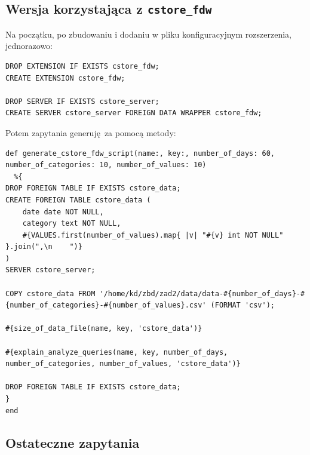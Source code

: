 \documentclass[a4paper,11pt]{article}
\begin{document}
\subsection{Wersja korzystająca z \texttt{cstore\_fdw}}

Na początku, po zbudowaniu i dodaniu w pliku konfiguracyjnym rozszerzenia, jednorazowo:
\begin{lstlisting}
DROP EXTENSION IF EXISTS cstore_fdw;
CREATE EXTENSION cstore_fdw;

DROP SERVER IF EXISTS cstore_server;
CREATE SERVER cstore_server FOREIGN DATA WRAPPER cstore_fdw;
\end{lstlisting}
Potem zapytania generuję za pomocą metody:
\begin{lstlisting}
def generate_cstore_fdw_script(name:, key:, number_of_days: 60, number_of_categories: 10, number_of_values: 10)
  %{
DROP FOREIGN TABLE IF EXISTS cstore_data;
CREATE FOREIGN TABLE cstore_data (
    date date NOT NULL,
    category text NOT NULL,
    #{VALUES.first(number_of_values).map{ |v| "#{v} int NOT NULL" }.join(",\n    ")}
)
SERVER cstore_server;

COPY cstore_data FROM '/home/kd/zbd/zad2/data/data-#{number_of_days}-#{number_of_categories}-#{number_of_values}.csv' (FORMAT 'csv');

#{size_of_data_file(name, key, 'cstore_data')}

#{explain_analyze_queries(name, key, number_of_days, number_of_categories, number_of_values, 'cstore_data')}

DROP FOREIGN TABLE IF EXISTS cstore_data;
}
end
\end{lstlisting}


\subsection{Ostateczne zapytania}
\end{document}
